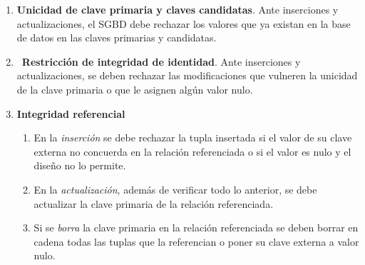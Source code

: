 \documentclass[12pt,spanish]{article}
\numberwithin{definition}{subsection}
\begin{document}
\begin{enumerate}
	\item \textbf{Unicidad de clave primaria y claves candidatas}. Ante inserciones y actualizaciones, el SGBD debe rechazar los valores que ya existan en la base de datos en las claves primarias y candidatas.
	\item\ \textbf{Restricción de integridad de identidad}. Ante inserciones y actualizaciones, se deben rechazar las modificaciones que vulneren la unicidad de la clave primaria o que le asignen algún valor nulo.
	\item \textbf{Integridad referencial}
		\begin{enumerate}
			\item En la \emph{inserción} se debe rechazar la tupla insertada si el valor de su clave externa no concuerda en la relación referenciada o si el valor es nulo y el diseño no lo permite.
			\item En la \emph{actualización}, además de verificar todo lo anterior, se debe actualizar la clave primaria de la relación referenciada.
			\item Si se \emph{borra} la clave primaria en la relación referenciada se deben borrar en cadena todas las tuplas que la referencian o poner su clave externa a valor nulo.
		\end{enumerate}
\end{enumerate}
\end{document}
